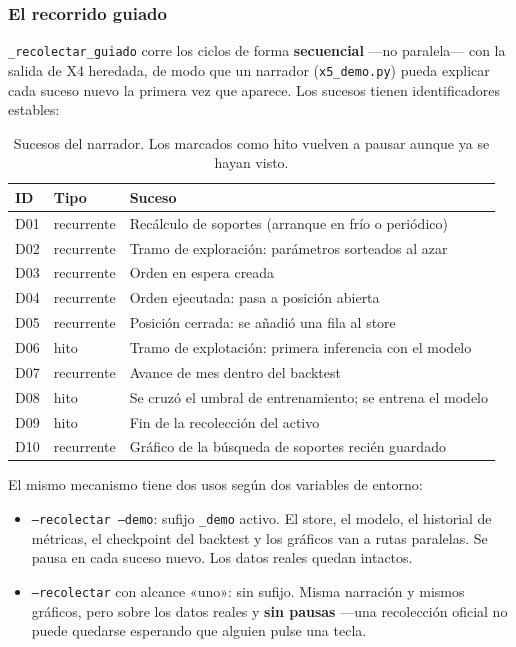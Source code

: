\documentclass[11pt,a4paper]{article}
\newcommand{\code}[1]{\texttt{\small #1}}
\newcommand{\bigsep}{\par\vspace{3pt}}
\begin{document}
\subsubsection{El recorrido guiado}

\code{_recolectar_guiado} corre los ciclos de forma \textbf{secuencial} —no paralela— con la
salida de X4 heredada, de modo que un narrador (\code{x5_demo.py}) pueda explicar cada
suceso nuevo la primera vez que aparece. Los sucesos tienen identificadores estables:

\begin{table}[h]
\centering
\small
\begin{tabularx}{\linewidth}{@{}l l X@{}}
\toprule
\textbf{ID} & \textbf{Tipo} & \textbf{Suceso} \\
\midrule
D01 & recurrente & Recálculo de soportes (arranque en frío o periódico) \\
D02 & recurrente & Tramo de exploración: parámetros sorteados al azar \\
D03 & recurrente & Orden en espera creada \\
D04 & recurrente & Orden ejecutada: pasa a posición abierta \\
D05 & recurrente & Posición cerrada: se añadió una fila al store \\
D06 & hito & Tramo de explotación: primera inferencia con el modelo \\
D07 & recurrente & Avance de mes dentro del backtest \\
D08 & hito & Se cruzó el umbral de entrenamiento; se entrena el modelo \\
D09 & hito & Fin de la recolección del activo \\
D10 & recurrente & Gráfico de la búsqueda de soportes recién guardado \\
\bottomrule
\end{tabularx}
\caption{Sucesos del narrador. Los marcados como hito vuelven a pausar aunque ya se hayan visto.}
\end{table}

\bigsep
El mismo mecanismo tiene dos usos según dos variables de entorno:

\begin{itemize}[leftmargin=1.4em,itemsep=2pt]
\item \code{--recolectar --demo}: sufijo \code{_demo} activo. El store, el modelo, el
historial de métricas, el checkpoint del backtest y los gráficos van a rutas paralelas. Se
pausa en cada suceso nuevo. Los datos reales quedan intactos.
\item \code{--recolectar} con alcance «uno»: sin sufijo. Misma narración y mismos gráficos,
pero sobre los datos reales y \textbf{sin pausas} —una recolección oficial no puede quedarse
esperando que alguien pulse una tecla.
\end{itemize}
\end{document}
